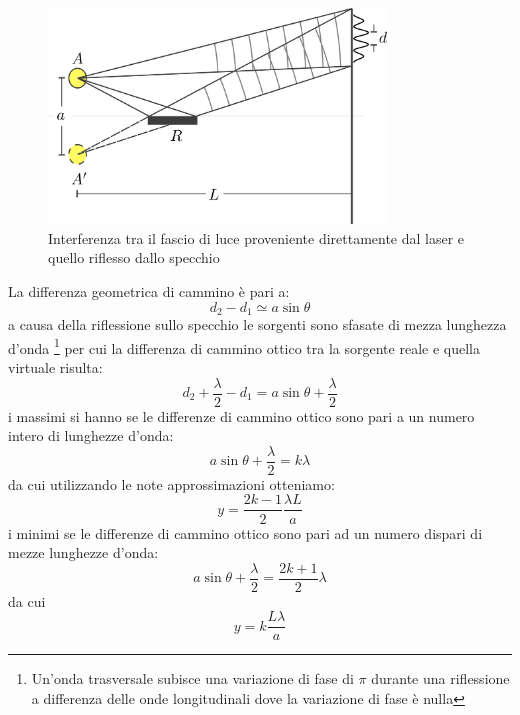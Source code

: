 \documentclass[a4paper,10pt,oneside]{article}
\begin{document}
\begin{figure}[H]
 \centering
 \includegraphics[width=0.8\textwidth]{./Immagini/lloyd1.png}
 \caption{Interferenza tra il fascio di luce proveniente direttamente dal laser e quello riflesso dallo specchio}
 \label{fig:lloyd}
\end{figure}
 La differenza geometrica di cammino è pari a:
\begin{equation}
 d_2-d_1\simeq a\sin \theta
\end{equation}
a causa della riflessione sullo specchio le sorgenti sono sfasate di mezza lunghezza d'onda \footnote{Un'onda trasversale subisce una variazione di fase di $\pi$ durante una riflessione a differenza delle onde longitudinali dove la variazione di fase è nulla} per cui la differenza di cammino ottico tra la sorgente reale e quella virtuale risulta:
\begin{equation}
 d_2+\frac \lambda 2 -d_1=a\sin \theta +\frac\lambda 2
\end{equation}
i massimi si hanno se  le differenze di cammino ottico sono pari a un numero intero di lunghezze d'onda:
\begin{equation}
 a\sin\theta+\frac \lambda 2=k\lambda
\end{equation}
da cui utilizzando le note approssimazioni otteniamo:
\begin{equation}\label{lloyd_max}
 y=\frac{2k-1}{2}\frac{\lambda L}{a}
\end{equation}
i minimi se le differenze di cammino ottico sono pari ad un numero dispari di mezze lunghezze d'onda:
\begin{equation}
 a\sin\theta+\frac \lambda 2=\frac{2k+1}{2}\lambda
\end{equation}
da cui
\begin{equation}\label{lloyd_min}
 y=k\frac{L\lambda}{a}
\end{equation}
\end{document}
